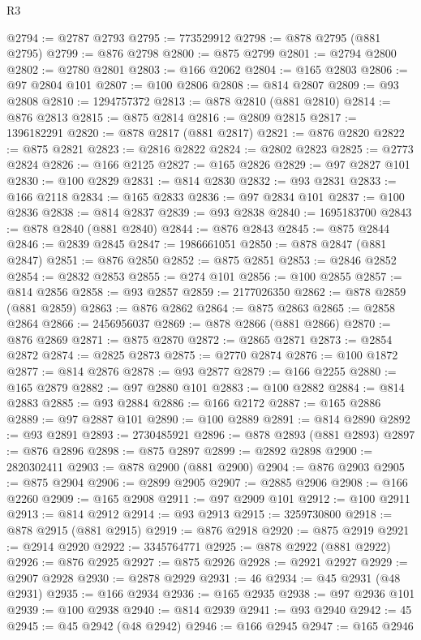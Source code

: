 \begin{lexlean}{R3}
\begin{coremodule}
@2794 := @2787 @2793
@2795 := 773529912
@2798 := @878 @2795 (@881 @2795)
@2799 := @876 @2798
@2800 := @875 @2799
@2801 := @2794 @2800
@2802 := @2780 @2801
@2803 := @166 @2062
@2804 := @165 @2803
@2806 := @97 @2804 @101
@2807 := @100 @2806
@2808 := @814 @2807
@2809 := @93 @2808
@2810 := 1294757372
@2813 := @878 @2810 (@881 @2810)
@2814 := @876 @2813
@2815 := @875 @2814
@2816 := @2809 @2815
@2817 := 1396182291
@2820 := @878 @2817 (@881 @2817)
@2821 := @876 @2820
@2822 := @875 @2821
@2823 := @2816 @2822
@2824 := @2802 @2823
@2825 := @2773 @2824
@2826 := @166 @2125
@2827 := @165 @2826
@2829 := @97 @2827 @101
@2830 := @100 @2829
@2831 := @814 @2830
@2832 := @93 @2831
@2833 := @166 @2118
@2834 := @165 @2833
@2836 := @97 @2834 @101
@2837 := @100 @2836
@2838 := @814 @2837
@2839 := @93 @2838
@2840 := 1695183700
@2843 := @878 @2840 (@881 @2840)
@2844 := @876 @2843
@2845 := @875 @2844
@2846 := @2839 @2845
@2847 := 1986661051
@2850 := @878 @2847 (@881 @2847)
@2851 := @876 @2850
@2852 := @875 @2851
@2853 := @2846 @2852
@2854 := @2832 @2853
@2855 := @274 @101
@2856 := @100 @2855
@2857 := @814 @2856
@2858 := @93 @2857
@2859 := 2177026350
@2862 := @878 @2859 (@881 @2859)
@2863 := @876 @2862
@2864 := @875 @2863
@2865 := @2858 @2864
@2866 := 2456956037
@2869 := @878 @2866 (@881 @2866)
@2870 := @876 @2869
@2871 := @875 @2870
@2872 := @2865 @2871
@2873 := @2854 @2872
@2874 := @2825 @2873
@2875 := @2770 @2874
@2876 := @100 @1872
@2877 := @814 @2876
@2878 := @93 @2877
@2879 := @166 @2255
@2880 := @165 @2879
@2882 := @97 @2880 @101
@2883 := @100 @2882
@2884 := @814 @2883
@2885 := @93 @2884
@2886 := @166 @2172
@2887 := @165 @2886
@2889 := @97 @2887 @101
@2890 := @100 @2889
@2891 := @814 @2890
@2892 := @93 @2891
@2893 := 2730485921
@2896 := @878 @2893 (@881 @2893)
@2897 := @876 @2896
@2898 := @875 @2897
@2899 := @2892 @2898
@2900 := 2820302411
@2903 := @878 @2900 (@881 @2900)
@2904 := @876 @2903
@2905 := @875 @2904
@2906 := @2899 @2905
@2907 := @2885 @2906
@2908 := @166 @2260
@2909 := @165 @2908
@2911 := @97 @2909 @101
@2912 := @100 @2911
@2913 := @814 @2912
@2914 := @93 @2913
@2915 := 3259730800
@2918 := @878 @2915 (@881 @2915)
@2919 := @876 @2918
@2920 := @875 @2919
@2921 := @2914 @2920
@2922 := 3345764771
@2925 := @878 @2922 (@881 @2922)
@2926 := @876 @2925
@2927 := @875 @2926
@2928 := @2921 @2927
@2929 := @2907 @2928
@2930 := @2878 @2929
@2931 := 46
@2934 := @45 @2931 (@48 @2931)
@2935 := @166 @2934
@2936 := @165 @2935
@2938 := @97 @2936 @101
@2939 := @100 @2938
@2940 := @814 @2939
@2941 := @93 @2940
@2942 := 45
@2945 := @45 @2942 (@48 @2942)
@2946 := @166 @2945
@2947 := @165 @2946

\end{coremodule}
\end{lexlean}
